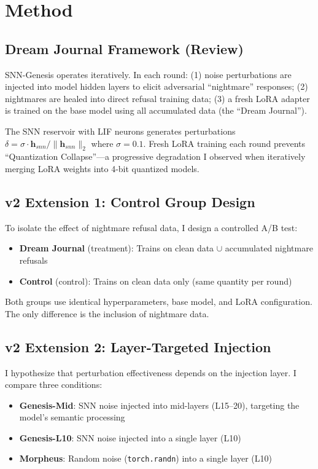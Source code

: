 \documentclass[11pt,a4paper]{article}
\begin{document}
\section{Method}

\subsection{Dream Journal Framework (Review)}

SNN-Genesis operates iteratively. In each round: (1) noise perturbations are injected into model hidden layers to elicit adversarial ``nightmare'' responses; (2) nightmares are healed into direct refusal training data; (3) a fresh LoRA adapter is trained on the base model using all accumulated data (the ``Dream Journal'').

The SNN reservoir with LIF neurons generates perturbations $\delta = \sigma \cdot \mathbf{h}_{snn} / \|\mathbf{h}_{snn}\|_2$ where $\sigma = 0.1$. Fresh LoRA training each round prevents ``Quantization Collapse''---a progressive degradation I observed when iteratively merging LoRA weights into 4-bit quantized models.

\subsection{v2 Extension 1: Control Group Design}

To isolate the effect of nightmare refusal data, I design a controlled A/B test:
\begin{itemize}
    \item \textbf{Dream Journal} (treatment): Trains on clean data $\cup$ accumulated nightmare refusals
    \item \textbf{Control} (control): Trains on clean data only (same quantity per round)
\end{itemize}
Both groups use identical hyperparameters, base model, and LoRA configuration. The only difference is the inclusion of nightmare data.

\subsection{v2 Extension 2: Layer-Targeted Injection}

I hypothesize that perturbation effectiveness depends on the injection layer. I compare three conditions:
\begin{itemize}
    \item \textbf{Genesis-Mid}: SNN noise injected into mid-layers (L15--20), targeting the model's semantic processing
    \item \textbf{Genesis-L10}: SNN noise injected into a single layer (L10)
    \item \textbf{Morpheus}: Random noise (\texttt{torch.randn}) into a single layer (L10)
\end{itemize}
\end{document}
